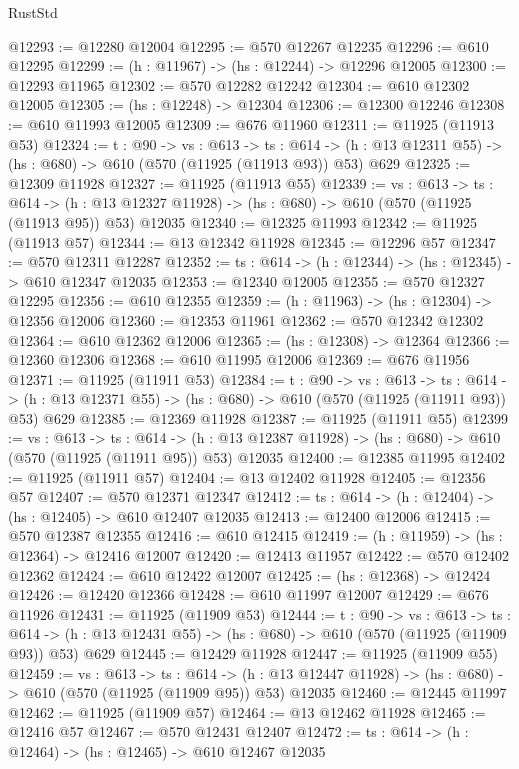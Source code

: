 \begin{lexlean}{RustStd}
\begin{coremodule}
@12293 := @12280 @12004
@12295 := @570 @12267 @12235
@12296 := @610 @12295
@12299 := (h : @11967) -> (hs : @12244) -> @12296 @12005
@12300 := @12293 @11965
@12302 := @570 @12282 @12242
@12304 := @610 @12302 @12005
@12305 := (hs : @12248) -> @12304
@12306 := @12300 @12246
@12308 := @610 @11993 @12005
@12309 := @676 @11960
@12311 := @11925 (@11913 @53)
@12324 := {t : @90} ->
  {vs : @613} ->
  {ts : @614} -> (h : @13 @12311 @55) -> (hs : @680) -> @610 (@570 (@11925 (@11913 @93)) @53) @629
@12325 := @12309 @11928
@12327 := @11925 (@11913 @55)
@12339 := {vs : @613} ->
  {ts : @614} ->
  (h : @13 @12327 @11928) -> (hs : @680) -> @610 (@570 (@11925 (@11913 @95)) @53) @12035
@12340 := @12325 @11993
@12342 := @11925 (@11913 @57)
@12344 := @13 @12342 @11928
@12345 := @12296 @57
@12347 := @570 @12311 @12287
@12352 := {ts : @614} -> (h : @12344) -> (hs : @12345) -> @610 @12347 @12035
@12353 := @12340 @12005
@12355 := @570 @12327 @12295
@12356 := @610 @12355
@12359 := (h : @11963) -> (hs : @12304) -> @12356 @12006
@12360 := @12353 @11961
@12362 := @570 @12342 @12302
@12364 := @610 @12362 @12006
@12365 := (hs : @12308) -> @12364
@12366 := @12360 @12306
@12368 := @610 @11995 @12006
@12369 := @676 @11956
@12371 := @11925 (@11911 @53)
@12384 := {t : @90} ->
  {vs : @613} ->
  {ts : @614} -> (h : @13 @12371 @55) -> (hs : @680) -> @610 (@570 (@11925 (@11911 @93)) @53) @629
@12385 := @12369 @11928
@12387 := @11925 (@11911 @55)
@12399 := {vs : @613} ->
  {ts : @614} ->
  (h : @13 @12387 @11928) -> (hs : @680) -> @610 (@570 (@11925 (@11911 @95)) @53) @12035
@12400 := @12385 @11995
@12402 := @11925 (@11911 @57)
@12404 := @13 @12402 @11928
@12405 := @12356 @57
@12407 := @570 @12371 @12347
@12412 := {ts : @614} -> (h : @12404) -> (hs : @12405) -> @610 @12407 @12035
@12413 := @12400 @12006
@12415 := @570 @12387 @12355
@12416 := @610 @12415
@12419 := (h : @11959) -> (hs : @12364) -> @12416 @12007
@12420 := @12413 @11957
@12422 := @570 @12402 @12362
@12424 := @610 @12422 @12007
@12425 := (hs : @12368) -> @12424
@12426 := @12420 @12366
@12428 := @610 @11997 @12007
@12429 := @676 @11926
@12431 := @11925 (@11909 @53)
@12444 := {t : @90} ->
  {vs : @613} ->
  {ts : @614} -> (h : @13 @12431 @55) -> (hs : @680) -> @610 (@570 (@11925 (@11909 @93)) @53) @629
@12445 := @12429 @11928
@12447 := @11925 (@11909 @55)
@12459 := {vs : @613} ->
  {ts : @614} ->
  (h : @13 @12447 @11928) -> (hs : @680) -> @610 (@570 (@11925 (@11909 @95)) @53) @12035
@12460 := @12445 @11997
@12462 := @11925 (@11909 @57)
@12464 := @13 @12462 @11928
@12465 := @12416 @57
@12467 := @570 @12431 @12407
@12472 := {ts : @614} -> (h : @12464) -> (hs : @12465) -> @610 @12467 @12035

\end{coremodule}
\end{lexlean}
